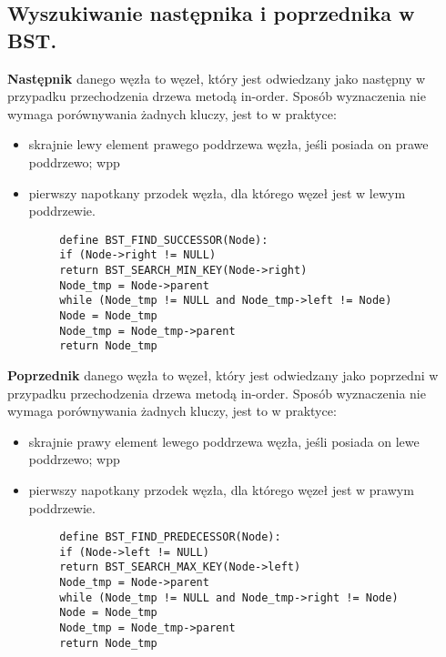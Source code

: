 \documentclass[main.tex]{subfiles}
\begin{document}
    \subsection{Wyszukiwanie następnika i poprzednika w BST.}
    \begin{definition}
        \textbf{Następnik} danego węzła to węzeł, który jest odwiedzany jako następny w przypadku przechodzenia drzewa
        metodą in-order. Sposób wyznaczenia nie wymaga porównywania żadnych kluczy, jest to w praktyce:
        \begin{itemize}
            \item skrajnie lewy element prawego poddrzewa węzła, jeśli posiada on prawe poddrzewo; wpp
            \item pierwszy napotkany przodek węzła, dla którego węzeł jest w lewym poddrzewie.
        \end{itemize}
    \end{definition}

    \begin{verbatim}
        define BST_FIND_SUCCESSOR(Node):
        if (Node->right != NULL)
        return BST_SEARCH_MIN_KEY(Node->right)
        Node_tmp = Node->parent
        while (Node_tmp != NULL and Node_tmp->left != Node)
        Node = Node_tmp
        Node_tmp = Node_tmp->parent
        return Node_tmp
    \end{verbatim}


    \begin{definition}
        \textbf{Poprzednik} danego węzła to węzeł, który jest odwiedzany jako poprzedni w przypadku przechodzenia drzewa
        metodą in-order. Sposób wyznaczenia nie wymaga porównywania żadnych kluczy, jest to w praktyce:
        \begin{itemize}
            \item skrajnie prawy element lewego poddrzewa węzła, jeśli posiada on lewe poddrzewo; wpp
            \item pierwszy napotkany przodek węzła, dla którego węzeł jest w prawym poddrzewie.
        \end{itemize}
    \end{definition}

    \begin{verbatim}
        define BST_FIND_PREDECESSOR(Node):
        if (Node->left != NULL)
        return BST_SEARCH_MAX_KEY(Node->left)
        Node_tmp = Node->parent
        while (Node_tmp != NULL and Node_tmp->right != Node)
        Node = Node_tmp
        Node_tmp = Node_tmp->parent
        return Node_tmp
    \end{verbatim}
\end{document}
